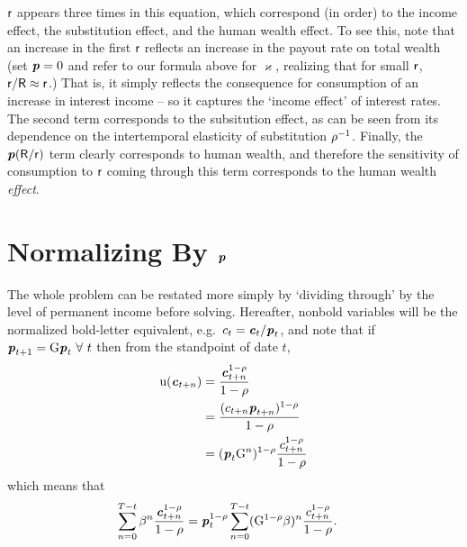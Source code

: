\documentclass{scrartcl}
\begin{document}
$\mathsf{r}$ appears three times in this equation, which correspond (in
order) to the income effect, the substitution effect, and the human
wealth effect.
To see this, note that an increase in the first
$\mathsf{r}$ reflects an increase in the payout rate on total wealth (set
$\boldsymbol{\mathit{p}} = 0$ and refer to our formula above for $\varkappa$, realizing
that for small $\mathsf{r}$, $\mathsf{r}/\mathsf{R} \approx \mathsf{r}$.)
That is, it
simply reflects the consequence for consumption of an increase in interest
income -- so it captures the `income effect' of interest rates.
The second term
corresponds to the subsitution effect, as can be seen from its
dependence on the intertemporal elasticity of substitution
$\rho^{-1}$.
Finally, the $\boldsymbol{\mathit{p}}(\mathsf{R}/\mathsf{r})$ term clearly
corresponds to human wealth, and therefore the sensitivity of
consumption to $\mathsf{r}$ coming through this term corresponds to the
human wealth \textit{effect}.

\section{Normalizing By $\boldsymbol{\mathit{p}}$}

The whole problem can be restated more simply by `dividing through' by the level of
permanent income before solving.
Hereafter, nonbold variables will be
the normalized bold-letter equivalent, e.g.\
$c_{t}=\boldsymbol{\mathit{c}}_{t}/\boldsymbol{\mathit{p}}_{t}$, and note that if
$\boldsymbol{\mathit{p}}_{t+1}={\mathrm{G}} \boldsymbol{\mathit{p}}_{t}~\forall~t$ then from the standpoint
of date $t$,
\begin{equation}\begin{gathered}\begin{aligned}
        \mathrm{u}(\boldsymbol{\mathit{c}}_{t+n}) & =  \frac{\boldsymbol{\mathit{c}}_{t+n}^{1-\rho}}{1-\rho}  \\
         & =  \frac{(c_{t+n}\boldsymbol{\mathit{p}}_{t+n})^{1-\rho}}{1-\rho}  \\
         & =  (\boldsymbol{\mathit{p}}_{t}{\mathrm{G}}^{n})^{1-\rho}\frac{c_{t+n}^{1-\rho}}{1-\rho}
\end{aligned}\end{gathered}\end{equation}
which means that 
\begin{equation}\begin{gathered}\begin{aligned}
        \sum_{n=0}^{T-t} \beta^{n}\frac{\boldsymbol{\mathit{c}}_{t+n}^{1-\rho}}{1-\rho} & =  \boldsymbol{\mathit{p}}_{t}^{1-\rho}\sum_{n=0}^{T-t} ({\mathrm{G}}^{1-\rho}\beta)^{n} \frac{c_{t+n}^{1-\rho}}{1-\rho}  \label{eq:maxc2}
.
\end{aligned}\end{gathered}\end{equation}
\end{document}
